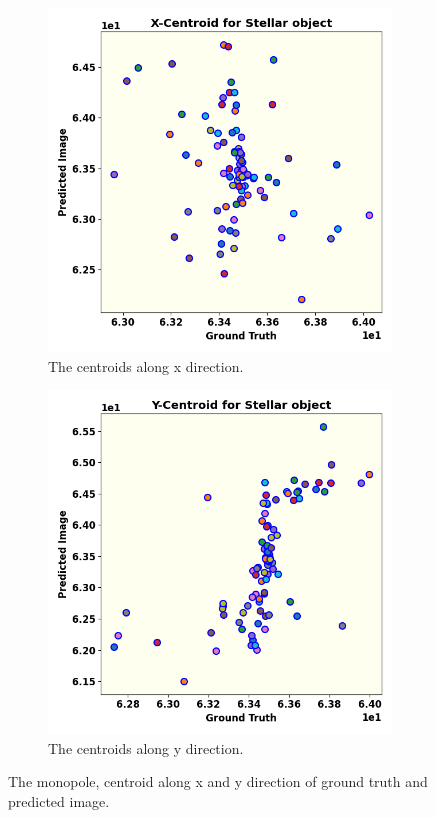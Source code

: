 \begin{figure}
\begin{subfigure}{0.33\linewidth}
		\includegraphics[width=\linewidth]{fig/moments/mom1.png}
		\caption{The centroids along x direction.}
		\label{fig:mom2}
	\end{subfigure}\hfill
	\begin{subfigure}{0.33\linewidth}
		\includegraphics[width=\linewidth]{fig/moments/mom2.png}
		\caption{The centroids along y direction.}
		\label{fig:mom3}
	\end{subfigure}\hfill
	\caption{The monopole, centroid along x and y direction of ground truth and predicted image.}
	\label{fig:cen}
\end{figure}
